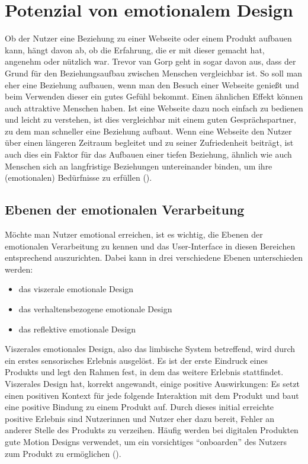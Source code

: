 \documentclass[./dokumentation.tex]{subfiles}
\begin{document}
\chapter{Potenzial von emotionalem Design}
Ob der Nutzer eine Beziehung zu einer Webseite oder einem Produkt aufbauen kann, hängt davon ab, ob die Erfahrung, die er mit dieser gemacht hat, angenehm oder nützlich war. Trevor van Gorp geht in \cite{vanGorp2013} sogar davon aus, dass der Grund für den Beziehungsaufbau zwischen Menschen vergleichbar ist. So soll man eher eine Beziehung aufbauen, wenn man den Besuch einer Webseite genießt und beim Verwenden dieser ein gutes Gefühl bekommt. Einen ähnlichen Effekt können auch attraktive Menschen haben. Ist eine Webseite dazu noch einfach zu bedienen und leicht zu verstehen, ist dies vergleichbar mit einem guten Gesprächspartner, zu dem man schneller eine Beziehung aufbaut. Wenn eine Webseite den Nutzer über einen längeren Zeitraum begleitet und zu seiner Zufriedenheit beiträgt, ist auch dies ein Faktor für das Aufbauen einer tiefen Beziehung, ähnlich wie auch Menschen sich an langfristige Beziehungen untereinander binden, um ihre (emotionalen) Bedürfnisse zu erfüllen (\cite{vanGorp2013}).

\section{Ebenen der emotionalen Verarbeitung}
Möchte man Nutzer emotional erreichen, ist es wichtig, die Ebenen der emotionalen Verarbeitung zu kennen und das User-Interface in diesen Bereichen entsprechend auszurichten. Dabei kann in drei verschiedene Ebenen unterschieden werden:
\begin{itemize}
    \item das viszerale emotionale Design
    \item das verhaltensbezogene emotionale Design
    \item das reflektive emotionale Design
\end{itemize}

Viszerales emotionales Design, also das limbische System betreffend, wird durch ein erstes sensorisches Erlebnis ausgelöst. Es ist der erste Eindruck eines Produkts und legt den Rahmen fest, in dem das weitere Erlebnis stattfindet. Viszerales Design hat, korrekt angewandt, einige positive Auswirkungen: Es setzt einen positiven Kontext für jede folgende Interaktion mit dem Produkt und baut eine positive Bindung zu einem Produkt auf. Durch dieses initial erreichte positive Erlebnis sind Nutzerinnen und Nutzer eher dazu bereit, Fehler an anderer Stelle des Produkts zu verzeihen.
Häufig werden bei digitalen Produkten gute Motion Designs verwendet, um ein vorsichtiges “onboarden” des Nutzers zum Produkt zu ermöglichen (\cite{medium_muz}).  
\end{document}
